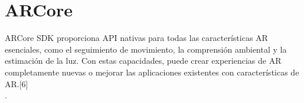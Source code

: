 \section{ARCore}
ARCore SDK proporciona API nativas para todas las características AR esenciales, como el seguimiento de movimiento, la comprensión ambiental y la estimación de la luz. Con estas capacidades, puede crear experiencias de AR completamente nuevas o mejorar las aplicaciones existentes con características de AR.[6] \\.\par 

